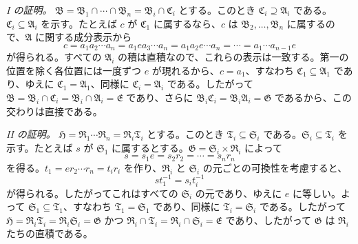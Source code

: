 \documentclass[11pt]{article}
\providecommand{\mG}{\mathfrak{G}}
\providecommand{\mA}{\mathfrak{A}}
\providecommand{\mB}{\mathfrak{B}}
\providecommand{\mC}{\mathfrak{C}}
\providecommand{\mE}{\mathfrak{E}}
\providecommand{\mH}{\mathfrak{H}}
\providecommand{\mR}{\mathfrak{R}}
\providecommand{\mS}{\mathfrak{S}}
\providecommand{\mT}{\mathfrak{T}}
\begin{document}
\emph{I の証明。} $\mB=\mB_1\cap\cdots\cap\mB_n=\mB_i\cap\mC_i$ とする。このとき $\mC_i\supseteq\mA_i$ である。$\mC_i\subseteq\mA_i$ を示す。たとえば $c$ が $\mC_1$ に属するなら、$c$ は $\mB_2,\ldots,\mB_n$ に属するので、$\mA$ に関する成分表示から
\[
        c=a_1a_2\cdots a_n=a_1ea_3\cdots a_n=a_1a_2e\cdots a_n=\cdots=a_1\cdots a_{n-1}e
\]
が得られる。すべての $\mA_i$ の積は直積なので、これらの表示は一致する。第一の位置を除く各位置には一度ずつ $e$ が現れるから、$c=a_1$、すなわち $\mC_1\subseteq\mA_1$ であり、ゆえに $\mC_1=\mA_1$、同様に $\mC_i=\mA_i$ である。したがって $\mB=\mB_i\cap\mC_i=\mB_i\cap\mA_i=\mE$ であり、さらに $\mB_i\mC_i=\mB_i\mA_i=\mG$ であるから、この交わりは直接である。

\emph{II の証明。} $\mH=\mR_1\cdots\mR_n=\mR_i\mT_i$ とする。このとき $\mT_i\subseteq\mS_i$ である。$\mS_i\subseteq\mT_i$ を示す。たとえば $s$ が $\mS_1$ に属するとする。$\mG=\mS_i\times\mR_i$ によって
\[
        s=s_1e=s_2r_2=\cdots=s_nr_n
\]
を得る。$t_1=er_2\cdots r_n=t_ir_i$ を作り、$\mR_i$ と $\mS_i$ の元ごとの可換性を考慮すると、
\[
        st_1^{-1}=s_it_i^{-1}
\]
が得られる。したがってこれはすべての $\mS_i$ の元であり、ゆえに $e$ に等しい。よって $\mS_1\subseteq\mT_1$、すなわち $\mT_1=\mS_1$ であり、同様に $\mT_i=\mS_i$ である。したがって $\mH=\mR_i\mT_i=\mR_i\mS_i=\mG$ かつ $\mR_i\cap\mT_i=\mR_i\cap\mS_i=\mE$ であり、したがって $\mG$ は $\mR_i$ たちの直積である。
\end{document}
